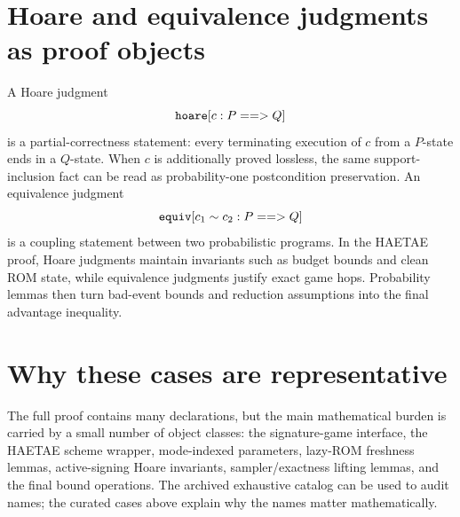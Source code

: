 \section{Hoare and equivalence judgments as proof objects}
\label{app:case-hoare-equiv}

A Hoare judgment
\[
  \texttt{hoare}[c:P==>Q]
\]
is a partial-correctness statement: every terminating execution of \(c\) from a
\(P\)-state ends in a \(Q\)-state.  When \(c\) is additionally proved lossless,
the same support-inclusion fact can be read as probability-one postcondition
preservation.  An equivalence
judgment
\[
  \texttt{equiv}[c_1 \sim c_2:P==>Q]
\]
is a coupling statement between two probabilistic programs.  In the HAETAE proof,
Hoare judgments maintain invariants such as budget bounds and clean ROM state,
while equivalence judgments justify exact game hops.  Probability lemmas then
turn bad-event bounds and reduction assumptions into the final advantage
inequality.

\section{Why these cases are representative}
\label{app:case-representative}

The full proof contains many declarations, but the main mathematical burden is
carried by a small number of object classes: the signature-game interface, the
HAETAE scheme wrapper, mode-indexed parameters, lazy-ROM freshness lemmas,
active-signing Hoare invariants, sampler/exactness lifting lemmas, and the final
bound operations.  The archived exhaustive catalog can be used to audit names;
the curated cases above explain why the names matter mathematically.
